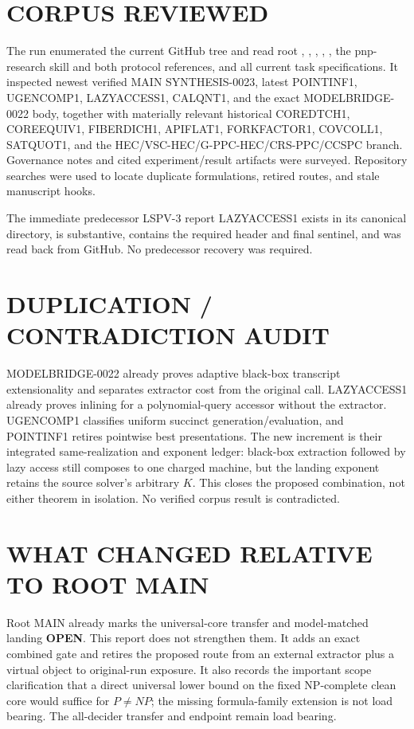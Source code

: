\documentclass[11pt]{article}
\newcommand{\OPEN}{\textbf{OPEN}}
\begin{document}
\section{CORPUS REVIEWED}
The run enumerated the current GitHub tree and read root ,
, , , , the
pnp-research skill and both protocol references, and all current task
specifications.  It inspected newest verified MAIN SYNTHESIS-0023, latest
POINTINF1, UGENCOMP1, LAZYACCESS1, CALQNT1, and the exact MODELBRIDGE-0022
body, together with materially relevant historical COREDTCH1, COREEQUIV1,
FIBERDICH1, APIFLAT1, FORKFACTOR1, COVCOLL1, SATQUOT1, and the
HEC/VSC-HEC/G-PPC-HEC/CRS-PPC/CCSPC branch.  Governance notes and cited
experiment/result artifacts were surveyed.  Repository searches were used to
locate duplicate formulations, retired routes, and stale manuscript hooks.

The immediate predecessor LSPV-3 report LAZYACCESS1 exists in its canonical
directory, is substantive, contains the required header and final sentinel,
and was read back from GitHub.  No predecessor recovery was required.

\section{DUPLICATION / CONTRADICTION AUDIT}
MODELBRIDGE-0022 already proves adaptive black-box transcript extensionality
and separates extractor cost from the original call.  LAZYACCESS1 already
proves inlining for a polynomial-query accessor without the extractor.
UGENCOMP1 classifies uniform succinct generation/evaluation, and POINTINF1
retires pointwise best presentations.  The new increment is their integrated
same-realization and exponent ledger: black-box extraction followed by lazy
access still composes to one charged machine, but the landing exponent retains
the source solver's arbitrary \(K\).  This closes the proposed combination,
not either theorem in isolation.  No verified corpus result is contradicted.

\section{WHAT CHANGED RELATIVE TO ROOT MAIN}
Root MAIN already marks the universal-core transfer and model-matched landing
\OPEN.  This report does not strengthen them.  It adds an exact combined gate
and retires the proposed route from an external extractor plus a virtual
object to original-run exposure.  It also records the important scope
clarification that a direct universal lower bound on the fixed NP-complete
clean core would suffice for \(P\ne NP\); the missing formula-family extension
is not load bearing.  The all-decider transfer and endpoint remain load
bearing.
\end{document}
